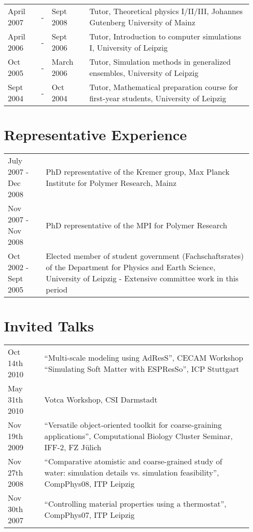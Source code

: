\documentclass{article}
\begin{document}
\begin{tabular}{lcll}
April 2007 &-& Sept 2008 & Tutor, Theoretical physics I/II/III, Johannes Gutenberg University of Mainz \\
April 2006 &-& Sept 2006 & Tutor, Introduction to computer simulations I, University of Leipzig \\
Oct 2005 &-& March 2006 & Tutor, Simulation methods in generalized ensembles, University of Leipzig \\
Sept 2004 &-& Oct 2004 & Tutor, Mathematical preparation course for first-year students, University of Leipzig \\
\end{tabular}

\section*{Representative Experience}

\begin{tabular}{p{}p{}}
July 2007 - Dec 2008 & PhD representative of the Kremer group, Max Planck Institute for Polymer Research, Mainz \\
Nov 2007 - Nov 2008 & PhD representative of the MPI for Polymer Research \\
Oct 2002 - Sept 2005 & Elected member of student government (Fachschaftsrates) of the Department for Physics and Earth Science, University of Leipzig - Extensive committee work in this period\\
\end{tabular}

\section*{Invited Talks}

\begin{tabular}{p{}p{}}
Oct 14th 2010 & ``Multi-scale modeling using AdResS'', CECAM Workshop ``Simulating Soft Matter with ESPResSo'', ICP Stuttgart\\
May 31th 2010 & Votca Workshop, CSI Darmstadt \\
Nov 19th 2009 & ``Versatile object-oriented toolkit for coarse-graining applications'', Computational Biology Cluster Seminar, IFF-2, FZ J{\"u}lich\\
Nov 27th 2008 & ``Comparative atomistic and coarse-grained study of water: simulation details vs. simulation feasibility'', CompPhys08, ITP Leipzig\\
Nov 30th 2007 & ``Controlling material properties using a thermostat'', CompPhys07, ITP Leipzig\\
\end{tabular}
\end{document}
